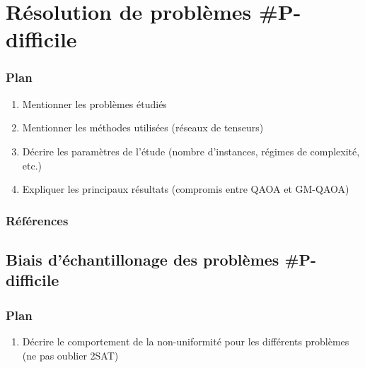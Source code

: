 \begin{comment}
- Gibs phenomenon
- Post-processing used (how impactful is removing non-distinct solutions?)
- How does clean TVD evolve with JVV steps (see proof)?
- Approximation ratio
- Numerical analysis (which mean to take)
\end{comment}

    \chapter{Résolution de problèmes \textsf{\#P}-difficile}


\subsection*{Plan}

\begin{enumerate}
    \item Mentionner les problèmes étudiés
    \item Mentionner les méthodes utilisées (réseaux de tenseurs)
    \item Décrire les paramètres de l'étude (nombre d'instances, régimes de complexité, etc.)
    \item Expliquer les principaux résultats (compromis entre QAOA et GM-QAOA)
\end{enumerate}

\subsection*{Références}


\section{Biais d'échantillonage des problèmes \textsf{\#P}-difficile}

\subsection*{Plan}

\begin{enumerate}
    \item Décrire le comportement de la non-uniformité pour les différents problèmes (ne pas oublier 2SAT)
\end{enumerate}

